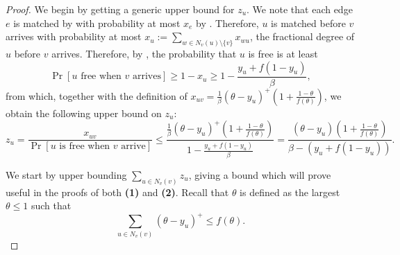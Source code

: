 \begin{proof}
	We begin by getting a generic upper bound for $z_u$. We note that each edge $e$ is matched by  with probability at most $x_e$ by . Therefore, $u$ is matched before $v$ arrives with probability at most $x_u := \sum_{w\in N_v(u)\setminus \{v\}} x_{wu}$, the fractional degree of $u$ before $v$ arrives.
	Therefore, by , the probability that $u$ is free is at least
\begin{equation}
\Pr[u \mbox{ free when $v$ arrives}] \geq 1-x_u \geq 1-\frac{y_u + f(1-y_u)}{\beta},
\end{equation}
from which, together with the definition of $x_{uv} = \frac{1}{\beta}(\theta - y_u)^+ \left(1 + \frac{1-\theta}{f(\theta)}\right)$, we obtain the following upper bound on $z_u$:
\begin{equation}\label{eq:z-upper-bound}
z_u = \frac{x_{uv}}{\Pr[\text{$u$ is free when $v$ arrive}]} \leq  \frac{\frac{1}{\beta}(\theta - y_u)^+ \left(1 + \frac{1-\theta}{f(\theta)}\right)}{1 - \frac{y_u+f(1-y_u)}{\beta}} = \frac{(\theta - y_u)\left(1 + \frac{1-\theta}{f(\theta)}\right)}{\beta - (y_u + f(1-y_u))}.
\end{equation}
		
We start by upper bounding $\sum_{u\in N_v(v)} z_u$, giving a bound which will prove useful in the proofs of both {\bf (1)} and {\bf(2)}. Recall that $\theta$ is defined as the largest $\theta\leq 1$ such that 
\begin{equation}\label{eq:def-theta}
	\sum_{u\in N_v(v)} (\theta-y_u)^+ \leq f(\theta).
\end{equation}


\end{proof}
